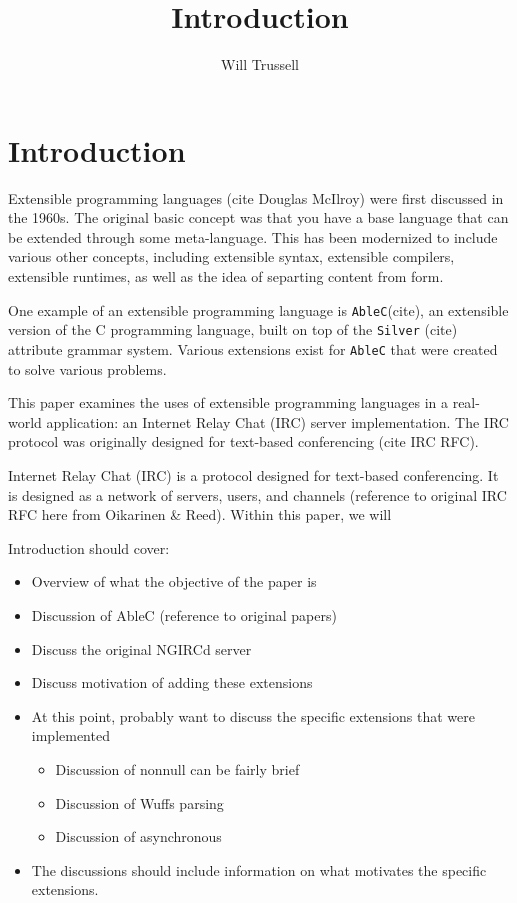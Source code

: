 \documentclass[12pt]{article}
\author{Will Trussell}
\title{Introduction}
\begin{document}
\section{Introduction}

Extensible programming languages (cite Douglas McIlroy) were first discussed in
the 1960s. The original basic concept was that you have a base language that can
be extended through some meta-language. This has been modernized to include 
various other concepts, including extensible syntax, extensible compilers, 
extensible runtimes, as well as the idea of separting content from form.

One example of an extensible programming language is \verb|AbleC|(cite), an 
extensible version of the C programming language, built on top of the 
\verb|Silver| (cite) attribute grammar system. Various extensions exist for 
\verb|AbleC| that were created to solve various problems.

This paper examines the uses of extensible programming languages in a real-world
application: an Internet Relay Chat (IRC) server implementation. The IRC
protocol was originally designed for text-based conferencing (cite IRC RFC).

Internet Relay Chat (IRC) is a protocol designed for text-based conferencing. It
is designed as a network of servers, users, and channels (reference to original
IRC RFC here from Oikarinen \& Reed). Within this paper, we will

Introduction should cover:
\begin{itemize}
    \item Overview of what the objective of the paper is
    \item Discussion of AbleC (reference to original papers)
    \item Discuss the original NGIRCd server
    \item Discuss motivation of adding these extensions
    \item At this point, probably want to discuss the specific extensions that 
        were implemented
        \begin{itemize}
            \item Discussion of nonnull can be fairly brief
            \item Discussion of Wuffs parsing
            \item Discussion of asynchronous
        \end{itemize}
    \item The discussions should include information on what motivates the 
        specific extensions.
\end{itemize}
\end{document}

